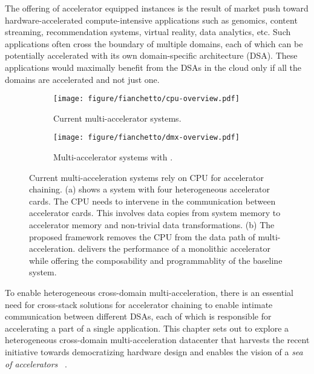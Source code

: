 The offering of accelerator equipped instances is the result of market push toward hardware-accelerated compute-intensive applications such as genomics, content streaming, recommendation systems, virtual reality, data analytics, etc. 
%
Such applications often cross the boundary of multiple domains, each of which can be potentially accelerated with its own domain-specific architecture (DSA). 
%
These applications would maximally benefit from the DSAs in the cloud only if all the domains are accelerated and not just one. 
%

%
\begin{figure}[ht!]
    \centering
    \begin{subfigure}[b]{\columnwidth}
    \texttt{[image: figure/fianchetto/cpu-overview.pdf]}
    \caption{Current multi-accelerator systems.}
    \label{fig:overview:current}
    \end{subfigure}
    \hspace{0.5in}
    \begin{subfigure}[b]{\columnwidth}
    \texttt{[image: figure/fianchetto/dmx-overview.pdf]}
    \caption{Multi-accelerator systems with \dmx.}
    \label{fig:overview:dmx}
    \end{subfigure}
    \caption{Current multi-acceleration systems rely on CPU for accelerator chaining. (a) shows a system with four heterogeneous accelerator cards. The CPU needs to intervene in the communication between accelerator cards. This involves data copies from system memory to accelerator memory and non-trivial data transformations. (b) The proposed \dmx framework removes the CPU from the data path of multi-acceleration. \dmx delivers the performance of a monolithic accelerator while offering the composability and programmablity of the baseline system.}
    
\label{fig:overview}
\end{figure}

To enable heterogeneous cross-domain multi-acceleration, there is an essential need for cross-stack solutions for accelerator chaining to enable intimate communication between different DSAs, each of which is responsible for accelerating a part of a single application. 
%
This chapter sets out to explore a heterogeneous cross-domain multi-acceleration datacenter that harvests the recent initiative towards democratizing hardware design and enables the vision of a \textit{sea of accelerators}
~\cite{pymtl3:ieee-micro:2020, basejump:dac:2018, blackparrot:ieee-micro:2020, democratizing:cacm:2022, profiling:isca:2023}.

